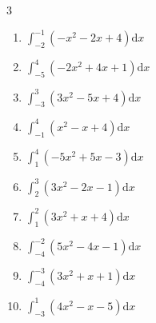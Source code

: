 \begin{multicols}{3}
\begin{enumerate}
\columnbreak %

\resetques

  \item $\displaystyle \int_{-2}^{-1}\left( -x^{2}-2x+4 \right) \mathrm{d}x$


  \item $\displaystyle \int_{-5}^{4}\left( -2x^{2}+4x+1 \right) \mathrm{d}x$


  \item $\displaystyle \int_{-3}^{3}\left( 3x^{2}-5x+4 \right) \mathrm{d}x$

        \phantom{$\displaystyle =58$}

  \item $\displaystyle \int_{-1}^{4}\left( x^{2}-x+4 \right) \mathrm{d}x$


  \item $\displaystyle \int_{1}^{4}\left( -5x^{2}+5x-3 \right) \mathrm{d}x$

        \phantom{$\displaystyle =-69$}

\columnbreak %

  \item $\displaystyle \int_{2}^{3}\left( 3x^{2}-2x-1 \right) \mathrm{d}x$


  \item $\displaystyle \int_{1}^{2}\left( 3x^{2}+x+4 \right) \mathrm{d}x$


  \item $\displaystyle \int_{-4}^{-2}\left( 5x^{2}-4x-1 \right) \mathrm{d}x$

        \phantom{$\displaystyle =117$}

  \item $\displaystyle \int_{-4}^{-3}\left( 3x^{2}+x+1 \right) \mathrm{d}x$


  \item $\displaystyle \int_{-3}^{1}\left( 4x^{2}-x-5 \right) \mathrm{d}x$

        \phantom{$\displaystyle =38$}

\columnbreak %


\end{enumerate}
\end{multicols}
